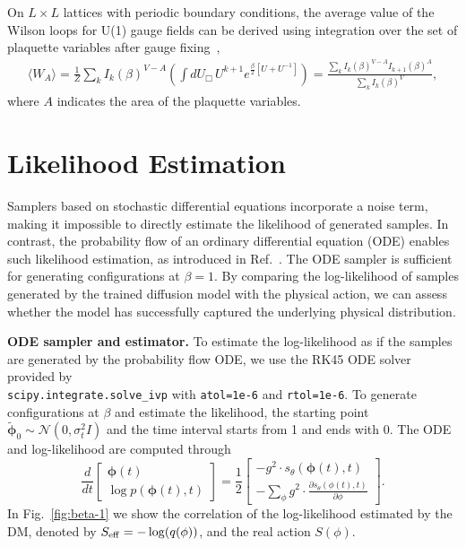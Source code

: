 \documentclass[a4paper,11pt]{article}
\newcommand{\el}{\vspace*{0.2cm}}
\begin{document}
On $L\times L$ lattices with periodic boundary conditions, the average value of the Wilson loops for U(1) gauge fields can be derived using integration over the set of plaquette variables after gauge fixing~\cite{Kanwar:2021wzm},
\begin{align}
    \langle W_A \rangle = \frac{1}{Z} \sum_k I_k(\beta)^{V - A}\left(\int dU_{\Box}\, U^{k+1} e^{\frac{\beta}{2}[U + U^{-1}]}  \right)
    = \frac{\sum_k I_k(\beta)^{V-A} I_{k+1}(\beta)^A}{\sum_k I_k(\beta)^V},
\end{align}
where $A$ indicates the area of the plaquette variables. 



\section{Likelihood Estimation}
\label{app:likelihood_estimation}

Samplers based on stochastic differential equations incorporate a noise term, making it impossible to directly estimate the likelihood of generated samples. In contrast, the probability flow of an ordinary differential equation (ODE) \cite{song2020score} enables such likelihood estimation, as introduced in Ref.~\cite{Wang:2023exq}. The ODE sampler is sufficient for generating configurations at $\beta=1$. By comparing the log-likelihood of samples generated by the trained diffusion model with the physical action, we can assess whether the model has successfully captured the underlying physical distribution.

\el\noindent
\textbf{ODE sampler and estimator.} To estimate the log-likelihood as if the samples are generated by the probability flow ODE, we use the RK45 ODE solver provided by \\
\texttt{scipy.integrate.solve\_ivp} with \texttt{atol=1e-6} and \texttt{rtol=1e-6}. To generate configurations at $\beta$ and estimate the likelihood, the starting point $\tilde{\mathbf{\phi}}_0\sim \mathcal{N}(0, \sigma_t^2 I)$ and the time interval starts from 1 and ends with 0. The ODE and log-likelihood are computed through
 \begin{equation}
     \frac{d}{dt} \left[ 
     \begin{array}{c}
         \mathbf{\phi}(t) \\
         \log p(\mathbf{\phi}(t), t)
     \end{array}
     \right] 
     = \frac{1}{2} \left[
     \begin{array}{c}
     -  g^2 \cdot s_\theta(\mathbf{\phi}(t), t) \\
     - \sum_{\phi}   g^2 \cdot \frac{\partial s_\theta(\phi(t), t)}{\partial \phi}
     \end{array}
     \right].
\label{eq:ODE}
\end{equation}
%
In Fig.~\ref{fig:beta-1} we show the correlation of the log-likelihood estimated by the DM, denoted by $S_{\rm eff}=-\log(q(\phi))$, and the real action $S(\phi)$.
\end{document}
